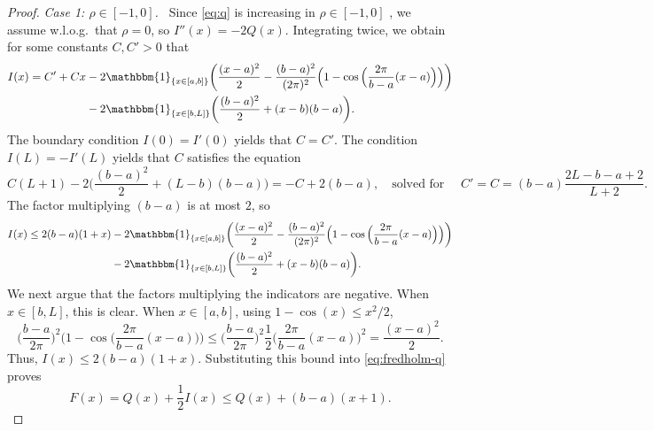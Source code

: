 \documentclass[a4paper, a4wide, 10pt, reqno]{amsart}
\theoremstyle{plain}
\theoremstyle{definition}
\numberwithin{equation}{section}
\newcommand{\ind}[1]{\mathbbm{1}_{\{#1\}}}
\begin{document}
\begin{proof}
        \smallskip 
        \noindent 
        \emph{Case 1: $\rho\in[-1,0]$.\ } Since \eqref{eq:q} is increasing in $\rho\in [-1,0]$
        , we assume w.l.o.g.\ that $\rho=0$, so $I''(x)=-2Q(x)$. Integrating twice, we obtain for some constants $C, C'>0$ that  
        \begin{equation}\nonumber
        \begin{aligned}
        I(x) = C' + Cx &- 2\ind{x\in[a, b]}\bigg(\frac{(x-a)^2}{2} - \frac{(b-a)^2}{(2\pi)^2}\Big(1-\cos\Big(\frac{2\pi}{b-a}(x-a)\Big) \Big)\bigg) \\& -2\ind{x\in[b, L]}\bigg(\frac{(b-a)^2}{2}+(x-b)(b-a)\bigg).\end{aligned}
        \end{equation}
        The boundary condition $I(0)=I'(0)$ yields that $C=C'$. The condition $I(L)=-I'(L)$ yields that $C$ satisfies the equation 
        \[
        C(L+1)-2\Big(\frac{(b-a)^2}{2} + (L-b)(b-a)\Big)  = -C+2(b-a), \quad \text{solved for }\quad C'=C = (b-a)\frac{2L-b-a+2}{L+2}.
        \]
        The factor multiplying $(b-a)$ is at most $2$, so 
        \begin{equation}\label{eq:i-rho0}
        \begin{aligned}
        I(x) \le 2(b-a)(1+x) &- 2\ind{x\in[a, b]}\bigg(\frac{(x-a)^2}{2} - \frac{(b-a)^2}{(2\pi)^2}\Big(1-\cos\Big(\frac{2\pi}{b-a}(x-a)\Big) \Big)\bigg) \\& -2\ind{x\in[b, L]}\bigg(\frac{(b-a)^2}{2}+(x-b)(b-a)\bigg).\end{aligned}
        \end{equation}
        We next argue that the factors multiplying the indicators are negative. When $x\in[b,L]$, this is clear. When $x\in[a,b]$, using $1-\cos(x)\le x^2/2$,\[
 \Big(\frac{b-a}{2\pi}\Big)^2\bigg(1-\cos\Big(\frac{2\pi}{b-a}(x-a)\Big)\bigg) \le \Big(\frac{b-a}{2\pi}\Big)^2\frac{1}{2}\Big(\frac{2\pi}{b-a}(x-a)\Big)^2=\frac{(x-a)^2}2.
\]
Thus, $I(x)\le 2(b-a)(1+x)$. Substituting this bound into \eqref{eq:fredholm-q} proves
\[
F(x)=Q(x) + \frac{1}{2}I(x)\le Q(x)+(b-a)(x+1).
\] 


\end{proof}
\end{document}
